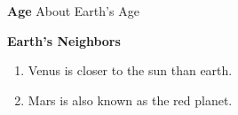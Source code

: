 \textbf{Age}
About Earth's Age

\textbf{Earth's Neighbors}
\begin{figure}[H]
\centering
{}
\qquad
{}
\end{figure}

\begin{enumerate}[label=\alph*)]
  \item{Venus}
is closer to the sun than earth.
  \item{Mars}
    is also known as the red planet.  
\end{enumerate}


